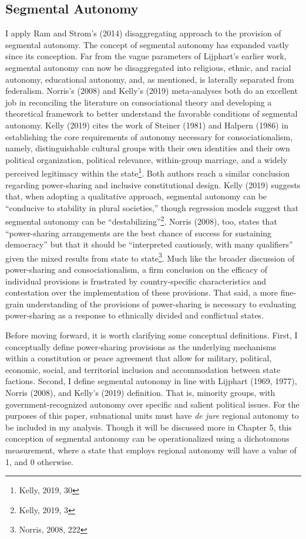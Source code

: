 \documentclass[12pt]{article}
\begin{document}
\subsection{Segmental Autonomy}
I apply Ram and Strom's (2014) disaggregating approach to the provision of segmental autonomy. The concept of segmental autonomy has expanded vastly since its conception. Far from the vague parameters of Lijphart’s earlier work, segmental autonomy can now be disaggregated into religious, ethnic, and racial autonomy, educational autonomy, and, as mentioned, is laterally separated from federalism. Norris’s (2008) and Kelly’s (2019) meta-analyses both do an excellent job in reconciling the literature on consociational theory and developing a theoretical framework to better understand the favorable conditions of segmental autonomy. Kelly (2019) cites the work of Steiner (1981) and Halpern (1986) in establishing the core requirements of autonomy necessary for consociationalism, namely, distinguishable cultural groups with their own identities and their own political organization, political relevance, within-group marriage, and a widely perceived legitimacy within the state\footnote{Kelly, 2019, 30}. Both authors reach a similar conclusion regarding power-sharing and inclusive constitutional design. Kelly (2019) suggests that, when adopting a qualitative approach, segmental autonomy can be ``conducive to stability in plural societies,'' though regression models suggest that segmental autonomy can be ``destabilizing''\footnote{Kelly, 2019, 3}. Norris (2008), too, states that ``power-sharing arrangements are the best chance of success for sustaining democracy'' but that it should be ``interpreted cautiously, with many qualifiers'' given the mixed results from state to state\footnote{Norris, 2008, 222}. Much like the broader discussion of power-sharing and consociationalism, a firm conclusion on the efficacy of individual provisions is frustrated by country-specific characteristics and contestation over the implementation of these provisions. That said, a more fine-grain understanding of the provisions of power-sharing is necessary to evaluating power-sharing as a response to ethnically divided and conflictual states.  

Before moving forward, it is worth clarifying some conceptual definitions. First, I conceptually define power-sharing provisions as the underlying mechanisms within a constitution or peace agreement that allow for military, political, economic, social, and territorial inclusion and accommodation between state factions. Second, I define segmental autonomy in line with Lijphart (1969, 1977), Norris (2008), and Kelly’s (2019) definition. That is, minority groups, with government-recognized autonomy over specific and salient political issues. For the purposes of this paper, subnational units must have \textit{de jure} regional autonomy to be included in my analysis. Though it will be discussed more in Chapter 5, this conception of segmental autonomy can be operationalized using a dichotomous measurement, where a state that employs regional autonomy will have a value of 1, and 0 otherwise. 
\end{document}
